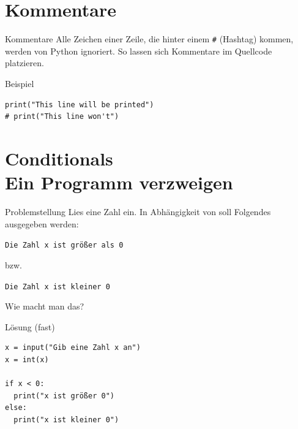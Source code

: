 \section{Kommentare}

\begin{fragile}


\begin{block}{Kommentare}
\vspace{2pt}
Alle Zeichen einer Zeile, die hinter einem \texttt{\#} (Hashtag) kommen, werden von Python ignoriert.
So lassen sich Kommentare im Quellcode platzieren. 
\end{block}

\vspace{12pt}

\pause
\begin{exampleblock}{Beispiel}
\begin{verbatim}
print("This line will be printed")
# print("This line won't") 
\end{verbatim}
\end{exampleblock}

\end{fragile}



\section{Conditionals \\ \footnotesize Ein Programm verzweigen}

\begin{frame}
	\begin{block}{Problemstellung}
		\vspace{2pt}
		Lies eine Zahl  ein. In Abhängigkeit von  soll Folgendes ausgegeben werden: 
		
		\texttt{Die Zahl x ist größer als 0} 
		
		bzw. 
		
		\texttt{Die Zahl x ist kleiner 0}  
		\vspace{8pt}
		
		
		Wie macht man das?
		\end{block}
\end{frame}

\begin{fragile}
	
\begin{block}{Lösung \footnotesize(fast)}
\begin{verbatim}
x = input("Gib eine Zahl x an")
x = int(x)

if x < 0:
  print("x ist größer 0")
else:
  print("x ist kleiner 0")
\end{verbatim}
\end{block}
	
\end{fragile}


